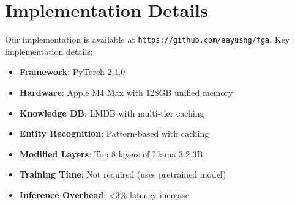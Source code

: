 \documentclass[11pt, a4paper]{article}
\theoremstyle{definition}
\begin{document}
\section{Implementation Details}

Our implementation is available at \texttt{https://github.com/aayushg/fga}. Key implementation details:

\begin{itemize}
    \item \textbf{Framework}: PyTorch 2.1.0
    \item \textbf{Hardware}: Apple M4 Max with 128GB unified memory
    \item \textbf{Knowledge DB}: LMDB with multi-tier caching
    \item \textbf{Entity Recognition}: Pattern-based with caching
    \item \textbf{Modified Layers}: Top 8 layers of Llama 3.2 3B
    \item \textbf{Training Time}: Not required (uses pretrained model)
    \item \textbf{Inference Overhead}: <3\% latency increase
\end{itemize}
\end{document}
